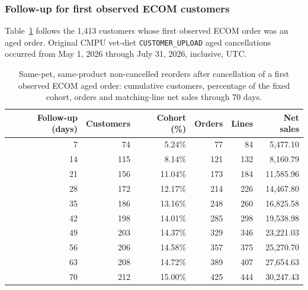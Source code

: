 \clearpage
\subsubsection{Follow-up for first observed ECOM customers}
Table~\ref{tab:financial-opportunity-new-chewy-follow-up} follows the
1,413 customers whose first observed ECOM order was an aged order. Original CMPU vet-diet
\texttt{CUSTOMER\_UPLOAD} aged cancellations occurred from
May 1, 2026 through July 31, 2026, inclusive, UTC.

\begin{table}[!htbp]
\centering
\caption{Same-pet, same-product non-cancelled reorders after cancellation of a first observed ECOM aged order: cumulative customers, percentage of the fixed cohort, orders and matching-line net sales through 70 days.}
\label{tab:financial-opportunity-new-chewy-follow-up}
\begin{tabular}{@{}rrrrrr@{}}
\toprule
Follow-up (days) & Customers & Cohort (\%) & Orders & Lines & Net sales \\
\midrule
7 & 74 & 5.24\% & 77 & 84 & 5,477.10 \\
14 & 115 & 8.14\% & 121 & 132 & 8,160.79 \\
21 & 156 & 11.04\% & 173 & 184 & 11,585.96 \\
28 & 172 & 12.17\% & 214 & 226 & 14,467.80 \\
35 & 186 & 13.16\% & 248 & 260 & 16,825.58 \\
42 & 198 & 14.01\% & 285 & 298 & 19,538.98 \\
49 & 203 & 14.37\% & 329 & 346 & 23,221.03 \\
56 & 206 & 14.58\% & 357 & 375 & 25,270.70 \\
63 & 208 & 14.72\% & 389 & 407 & 27,654.63 \\
70 & 212 & 15.00\% & 425 & 444 & 30,247.43 \\
\bottomrule
\end{tabular}


\end{table}
